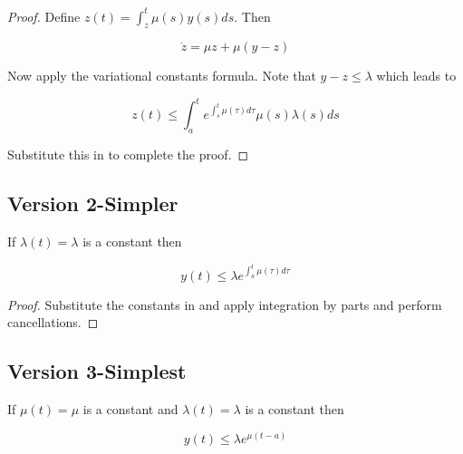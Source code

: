\begin{proof}
Define $z(t) = \int_z^t \mu(s)y(s)ds$.
Then

\begin{equation*}
\dot{z} = \mu z + \mu(y-z)
\end{equation*}

Now apply the variational constants formula.
Note that $y-z\leq\lambda$ which leads to

\begin{equation*}
z(t) \leq \int_a^t e^{\int_s^t \mu(\tau)d\tau}\mu(s)\lambda(s)ds
\end{equation*}

Substitute this in to complete the proof.
\end{proof}

\subsection{Version 2-Simpler}
\begin{lemma}
If $\lambda(t) = \lambda$ is a constant then

\begin{equation*}
y(t) \leq \lambda e^{\int_a^t \mu(\tau)d\tau}
\end{equation*}

\end{lemma}

\begin{proof}
Substitute the constants in and apply integration by parts and perform cancellations.
\end{proof}

\subsection{Version 3-Simplest}
\begin{lemma}
If $\mu(t) = \mu$ is a constant and $\lambda(t) = \lambda$ is a constant then

\begin{equation*}
y(t) \leq \lambda e^{\mu(t-a)}
\end{equation*}

\end{lemma}

